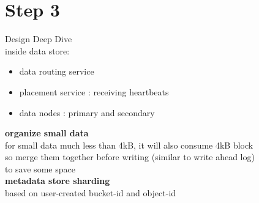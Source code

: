 \documentclass{article}
\begin{document}
\section{Step 3}
Design Deep Dive\\
inside data store:\\
\begin{itemize}
    \item data routing service
    \item placement service : receiving heartbeats
    \item data nodes : primary and secondary
\end{itemize}
\textbf{organize small data}\\
for small data much less than 4kB, it will also consume 4kB block\\
so merge them together before writing (similar to write ahead log)\\
to save some space\\
\textbf{metadata store sharding}\\
based on user-created bucket-id and object-id\\
\end{document}

